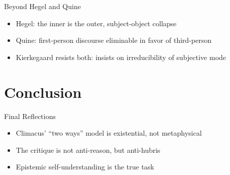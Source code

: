 \documentclass[12pt]{beamer}
\begin{document}
\begin{frame}{Beyond Hegel and Quine}
\begin{itemize}
  \item Hegel: the inner is the outer, subject-object collapse
  \item Quine: first-person discourse eliminable in favor of third-person
  \item Kierkegaard resists both: insists on irreducibility of subjective mode
\end{itemize}
\end{frame}

\section{Conclusion}

\begin{frame}{Final Reflections}
\begin{itemize}
  \item Climacus’ “two ways” model is existential, not metaphysical
  \item The critique is not anti-reason, but anti-hubris
  \item Epistemic self-understanding is the true task
\end{itemize}
\end{frame}
\end{document}
